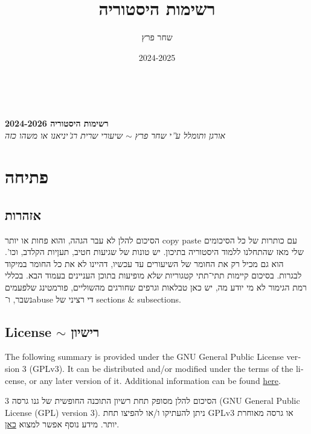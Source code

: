 \documentclass[a4paper]{book}
\author{שחר פרץ}
\title{רשימות היסטוריה}
\date{2024-2025}
\newcommand\name{רשימות היסטוריה 2024-2026}
\newcommand\en[1] {\begin{otherlanguage}{english}#1\end{otherlanguage}}
\begin{document}
	
	\renewcommand{\footrule}{\rule{\linewidth-19pt}{0.25pt}\vspace{-5pt}}
	\thispagestyle{empty}
	\,\! %
	
	{\vspace{0.5\textheight-2em} 
		{
			\begin{center} 
				{
					\textbf{{\name}
					} \\ 
					\textit{אורגן ותומלל ע''י שחר פרץ $\sim$ שיעורי שרית רג'יניאנו או משהו כזה}}
			\end{center}
		}
	}
	
	\newpage
	
	\section{פתיחה}
	\subsection{אזהרות}
	
	הסיכום להלן לא עבר הגהה, והוא פחות או יותר copy paste עם כותרות של כל הסיכומים שלי מאז שהתחלנו ללמוד היסטוריה בתיכון. יש טונות של שגיעות חטיב, תעןיות הקלדב, וכו'. הוא גם מכיל רק את החומר של השיעורים עד עכשיו, דהיינו לא את כל החומר במיקוד לבגרות. בסיכום קיימות תתי־תתי קטגוריות \textit{שלא} מופיעות בתוכן העניינים בעמוד הבא. בכללי רמת הגימור לא מי יודע מה, יש כאן טבלאות וגרפים שחורגים מהשוליים, פורמטינג שלפעמים נשבר, ו־abuse די רציני של sections \& subsections. 
	
	\subsection[רישיון]{License $\sim$ רישיון}
	\en{The following summary is provided under the GNU General Public License version 3 (GPLv3). It can be distributed and/or modified under the terms of the license, or any later version of it. Additional information can be found \href{https://www.gnu.org/licenses}{here}. }
	
	הסיכום להלן מסופק תחת רשיון התוכנה החופשית של גנו גרסה 3 (GNU General Public License (GPL) version 3). ניתן להעתיקו ו/או להפיצו תחת GPLv3 או גרסה מאוחרת יותר. מידע נוסף אפשר למצוא \href{https://www.gnu.org/licenses}{כאן}. 
	
	\newpage
	
	\thispagestyle{empty}
	\tableofcontents
	\thispagestyle{empty}
	
	\newpage
	
\end{document}
